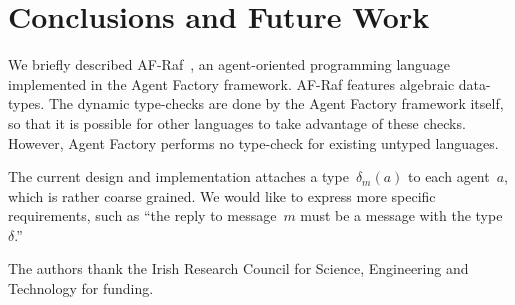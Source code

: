 \documentclass[preprint]{sigplanconf} %
\theoremstyle{remark}
\begin{document}
\section{Conclusions and Future Work} \label{sec:conclusions} %

We briefly described AF-Raf~\cite{site:af-raf}, an agent-oriented
programming language implemented in the Agent Factory framework. AF-Raf
features algebraic data-types. The dynamic type-checks are done by the
Agent Factory framework itself, so that it is possible for other languages
to take advantage of these checks. However, Agent Factory performs no
type-check for existing untyped languages.

The current design and implementation attaches a type~$\delta_m(a)$ to each
agent~$a$, which is rather coarse grained. We would like to express more
specific requirements, such as ``the reply to message~$m$ must be a message
with the type~$\delta$.''

%
%
%
%
\acks

The authors thank the Irish Research Council for Science, Engineering and
Technology for funding.




\end{document}
